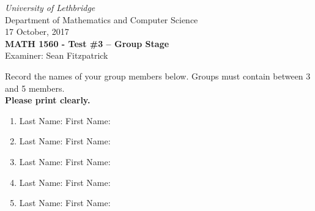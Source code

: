 \documentclass[12pt]{article}
\newcommand{\skipline}{\vspace{12pt}}
\begin{document}
\author{Instructor: Sean Fitzpatrick}
\thispagestyle{plain}
\begin{center}
\emph{University of Lethbridge}\\
Department of Mathematics and Computer Science\\
17 October, 2017\\
{\bf MATH 1560 - Test \#3 -- Group Stage}\\
Examiner: Sean Fitzpatrick
\end{center}

\skipline \skipline \skipline \noindent \skipline

Record the names of your group members below. Groups must contain between 3 and 5 members. \\

\textbf{Please print clearly.}

\skipline

\begin{enumerate}
\item Last Name:\underline{\hspace{200pt}} \quad First Name:\underline{\hspace{140pt}}

\skipline\skipline

\item Last Name:\underline{\hspace{200pt}} \quad First Name:\underline{\hspace{140pt}}

\skipline\skipline

\item Last Name:\underline{\hspace{200pt}} \quad First Name:\underline{\hspace{140pt}}

\skipline\skipline

\item Last Name:\underline{\hspace{200pt}} \quad First Name:\underline{\hspace{140pt}}

\skipline\skipline

\item Last Name:\underline{\hspace{200pt}} \quad First Name:\underline{\hspace{140pt}}

\end{enumerate}
%
\end{document}
